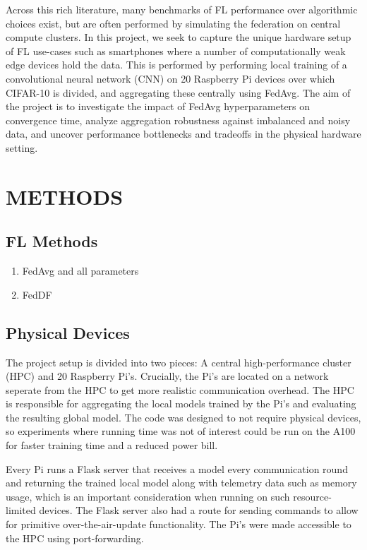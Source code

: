 \documentclass{article}
\begin{document}
Across this rich literature, many benchmarks of FL performance over algorithmic choices exist, but are often performed by simulating the federation on central compute clusters.
In this project, we seek to capture the unique hardware setup of FL use-cases such as smartphones where a number of computationally weak edge devices hold the data.
This is performed by performing local training of a convolutional neural network (CNN) on 20 Raspberry Pi devices over which CIFAR-10 \cite{alex2009learning} is divided, and aggregating these centrally using FedAvg.
The aim of the project is to investigate the impact of FedAvg hyperparameters on convergence time, analyze aggregation robustness against imbalanced and noisy data, and uncover performance bottlenecks and tradeoffs in the physical hardware setting.

\section{METHODS}%
\label{sec:methods}

\subsection{FL Methods}
\begin{enumerate}
    \item FedAvg and all parameters
    \item FedDF
\end{enumerate}

\subsection{Physical Devices}
The project setup is divided into two pieces: A central high-performance cluster (HPC) and 20 Raspberry Pi's.
Crucially, the Pi's are located on a network seperate from the HPC to get more realistic communication overhead.
The HPC is responsible for aggregating the local models trained by the Pi's and evaluating the resulting global model.
The code was designed to not require physical devices, so experiments where running time was not of interest could be run on the A100 for faster training time and a reduced power bill.

Every Pi runs a Flask server that receives a model every communication round and returning the trained local model along with telemetry data such as memory usage, which is an important consideration when running on such resource-limited devices.
The Flask server also had a route for sending commands to allow for primitive over-the-air-update functionality.
The Pi's were made accessible to the HPC using port-forwarding.
\end{document}
